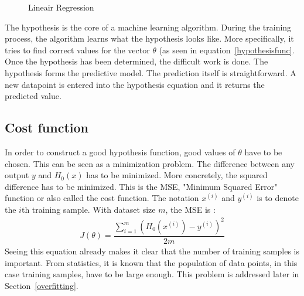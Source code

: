\begin{figure}[H]
\centering
{}
\caption{Lineair Regression} \label{fig:regression}
\end{figure}

\noindent The hypothesis is the core of a machine learning algorithm. During the training process, the algorithm learns what the hypothesis looks like. More specifically, it tries to find correct values for the vector $\theta$ (as seen in equation~\ref{hypothesisfunc}. Once the hypothesis has been determined, the difficult work is done. The hypothesis forms the predictive model. The prediction itself is straightforward. A new datapoint is entered into the hypothesis equation and it returns the predicted value.

\subsection{Cost function}
\label{costfunction}
In order to construct a good hypothesis function, good values of $\theta$ have to be chosen. This can be seen as a minimization problem. The difference between any output $y$ and $H_0(x)$ has to be minimized. More concretely, the squared difference has to be minimized. This is the MSE, "Minimum Squared Error" function or also called the cost function. The notation $x^{(i)}$ and $y^{(i)}$ is to denote the $i$th training sample. With dataset size $m$, the MSE is \cite{stanford}:
\begin{align}
J(\theta) = \dfrac{\sum\limits_{i=1}^m(H_0(x^{(i)}) - y^{(i)})^2}{2m} 
\end{align}
\noindent Seeing this equation already makes it clear that the number of training samples is important. From statistics, it is known that the population of data points, in this case training samples, have to be large enough. This problem is addressed later in Section~\ref{overfitting}.

